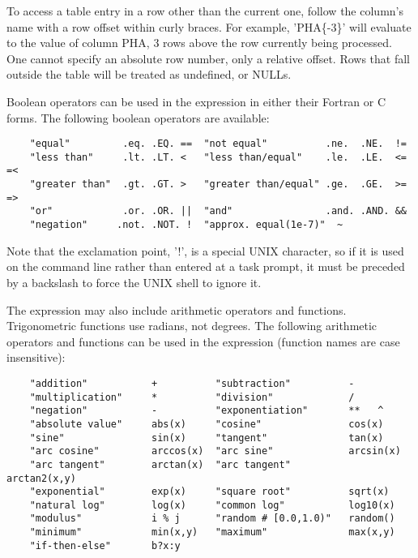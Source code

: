 \documentclass[11pt]{book}
\begin{document}
    To access a table entry in a row other  than the current one, follow
    the  column's name  with  a row  offset  within  curly  braces.  For
    example, 'PHA\{-3\}' will evaluate to the value  of column PHA, 3 rows
    above  the  row currently  being processed.   One  cannot specify an
    absolute row number, only a relative offset.  Rows that fall outside
    the table will be treated as undefined, or NULLs.

    Boolean   operators can be  used in  the expression  in either their
    Fortran or C forms.  The following boolean operators are available:

\begin{verbatim}
    "equal"         .eq. .EQ. ==  "not equal"          .ne.  .NE.  !=
    "less than"     .lt. .LT. <   "less than/equal"    .le.  .LE.  <= =<
    "greater than"  .gt. .GT. >   "greater than/equal" .ge.  .GE.  >= =>
    "or"            .or. .OR. ||  "and"                .and. .AND. &&
    "negation"     .not. .NOT. !  "approx. equal(1e-7)"  ~
\end{verbatim}

Note  that the exclamation
point,  '!', is a special UNIX character, so if it is used  on the
command line rather than entered at a task prompt, it must be  preceded
by a backslash to force the UNIX shell to ignore it.

    The expression may  also include arithmetic operators and functions.
    Trigonometric  functions use  radians,  not degrees.  The  following
    arithmetic  operators and  functions  can be  used in the expression
    (function names are case insensitive):


\begin{verbatim}
    "addition"           +          "subtraction"          -
    "multiplication"     *          "division"             /
    "negation"           -          "exponentiation"       **   ^
    "absolute value"     abs(x)     "cosine"               cos(x)
    "sine"               sin(x)     "tangent"              tan(x)
    "arc cosine"         arccos(x)  "arc sine"             arcsin(x)
    "arc tangent"        arctan(x)  "arc tangent"          arctan2(x,y)
    "exponential"        exp(x)     "square root"          sqrt(x)
    "natural log"        log(x)     "common log"           log10(x)
    "modulus"            i % j      "random # [0.0,1.0)"   random()
    "minimum"            min(x,y)   "maximum"              max(x,y)
    "if-then-else"       b?x:y
\end{verbatim}
\end{document}
